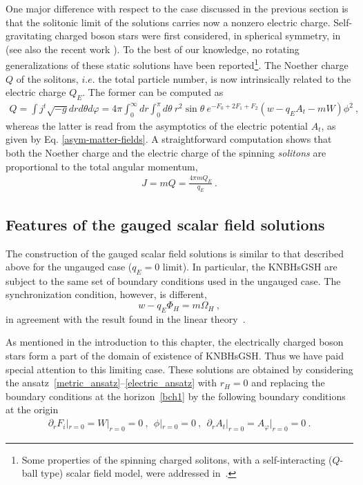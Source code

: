 One major difference with respect to the case 
discussed in the previous section 
 is that the solitonic limit of the solutions carries now a nonzero electric charge.
Self-gravitating charged boson stars were first considered, in spherical symmetry, in~\cite{Jetzer:1989av} 
(see also the recent work  \cite{Pugliese:2013gsa}). 
To the best of our knowledge, no rotating generalizations of these static solutions have been reported\footnote{ 
Some properties of the spinning charged solitons, 
with a self-interacting ($Q$-ball type) scalar field model, were addressed in~\cite{Brihaye:2009dx}.
}.
The Noether charge $Q$ of the solitons, $i.e.$ the total
particle number, is now intrinsically related to the electric charge $Q_E$. 
The former can be computed as  
%
\begin{eqnarray}
\label{Q1}
Q= \int j^t \sqrt{-g} dr  d\theta d\varphi=
 4\pi \int_{0}^\infty dr \int_0^\pi d\theta  
~r^2\sin \theta ~e^{-F_0+2F_1+F_2}  (w-q_E A_t -mW)\phi^2 \ ,
\end{eqnarray}
%
whereas the latter is read from the asymptotics
 of the electric potential $A_t$, as given by Eq. \eqref{asym-matter-fields}.
A straightforward computation 
shows that both the Noether charge and the electric charge of the spinning \textit{solitons}
are proportional  to the total angular momentum,
\begin{eqnarray}
\label{JQ}
J= m Q=\frac{4 \pi m Q_E}{q_E}\ .
\end{eqnarray} 


\subsection{Features of the gauged scalar field solutions}
\label{sec_results_g}
 
The construction of the  gauged scalar field solutions is similar 
to that described above for the ungauged case ($q_E=0$ limit).
In particular, the KNBHsGSH are subject to the same set of 
boundary conditions  used in the ungauged case.
The synchronization condition, however, is different,   
\begin{equation}
\label{cond-new}
 w-q_E \Phi_H=m \Omega_H \ ,
\end{equation}
in agreement with the result found in the linear theory~\cite{Hod:2014baa,Benone:2014ssa}.

As mentioned in the introduction to this chapter, the electrically charged boson stars form a part of the domain of existence of KNBHsGSH. 
Thus we have paid special attention to this limiting case.
These solutions  are obtained by considering the ansatz~\eqref{metric_ansatz}--\eqref{electric_ansatz} with $r_H=0$ 
and replacing the boundary conditions at the horizon~\eqref{bch1} 
by the following boundary conditions at the origin
\begin{eqnarray}
\label{bc0} 
\partial_r F_i|_{r=0}= 
W|_{r=0}=0\ ,~~
\phi| _{r =0}=0\ ,~~\partial_r A_t|_{r=0}=A_\varphi|_{r=0}=0\ .
\end{eqnarray}
% 

